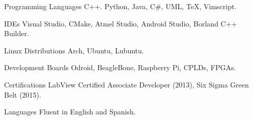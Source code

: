 
\begin{cvskills}


	\cvskill
		{Programming Languages}
			{C++. Python, Java, C\#, UML, \TeX, Vimscript.}

	\cvskill
		{IDEs}
			{Visual Studio, CMake, Atmel Studio, Android Studio, Borland C++ Builder.}

	\cvskill
		{Linux Distributions}
			{Arch, Ubuntu, Lubuntu.}

	\cvskill
		{Development Boards}
			{Odroid, BeagleBone, Raspberry Pi, CPLDs, FPGAs.}

	\cvskill
		{Certifications}
			{LabView Certified Associate Developer (2013), Six Sigma Green Belt (2015).}

	\cvskill
		{Languages}
			{Fluent in English and Spanish.}

\end{cvskills}
